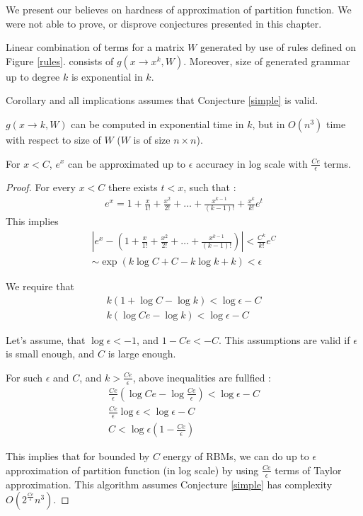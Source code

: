 We present our believes on hardness of approximation of partition function. 
We were not able to prove, or disprove conjectures presented in this chapter.
\begin{conjecture}
Linear combination of terms for a matrix $W$ generated by use of rules defined on Figure \ref{rules}.
consists of $g(x \rightarrow x^k, W)$. Moreover, size of generated grammar
up to degree $k$ is exponential in $k$.
\label{simple}
\end{conjecture}

Corollary and all implications assumes that Conjecture \ref{simple} is valid.

\begin{corollary}
	$g(x \rightarrow k, W)$
	can be computed in exponential time in $k$, but in $O(n^3)$ time with respect to size of $W$ ($W$ is of size $n \times n$).
\end{corollary}

\begin{lemma}
	For $x < C$, $e^x$ can be approximated up to $\epsilon$ accuracy in log scale with $\frac{Ce}{\epsilon}$ terms. 
\end{lemma}
\begin{proof}

For every $x < C$ there exists $t < x$, such that :  
\begin{align*}
	e^x = 1 + \frac{x}{1!} + \frac{x^2}{2!} + \dots + \frac{x^{k - 1}}{(k - 1)!} + \frac{x^k}{k!}e^t
\end{align*}
This implies
\begin{align*}
	|e^x - (1 + \frac{x}{1!} + \frac{x^2}{2!} + \dots + \frac{x^{k - 1}}{(k - 1)!}) | < \frac{C^k}{k!}e^C \\
	\sim \exp(k\log{C} + C - k\log{k} + k) < \epsilon
\end{align*}

We require that 
\begin{align*}
	k (1 + \log{C} - \log{k}) < \log{\epsilon} - C \\ 
	k (\log{Ce} - \log{k}) < \log{\epsilon} - C
\end{align*}

Let's assume, that $\log{\epsilon} < -1$, and $1 - Ce < -C$. This assumptions are valid if $\epsilon$ is small
enough, and $C$ is large enough.


For such $\epsilon$ and $C$, and $k > \frac{Ce}{\epsilon}$, above inequalities are fullfied :
\begin{align*}
	\frac{Ce}{\epsilon} (\log{Ce} - \log{\frac{Ce}{\epsilon}}) < \log{\epsilon} - C \\
	\frac{Ce}{\epsilon} \log{\epsilon} < \log{\epsilon} - C\\
	C < \log{\epsilon}(1 - \frac{Ce}{\epsilon})
\end{align*}

This implies that for bounded by $C$ energy of RBMs, we can do up to $\epsilon$ approximation of partition function (in log scale) by using
$\frac{Ce}{\epsilon}$ terms of Taylor approximation. This algorithm assumes Conjecture \ref{simple} has complexity
$O(2^{\frac{Ce}{\epsilon}}n^3)$.

\end{proof}



